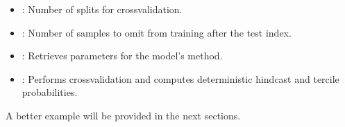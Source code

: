 \documentclass[letterpaper,10pt,english]{sphinxmanual}
\begin{document}
\sphinxAtStartPar
{}
\begin{itemize}
\item {} 
\sphinxAtStartPar
{}: Number of splits for cross\sphinxhyphen{}validation.

\item {} 
\sphinxAtStartPar
{}: Number of samples to omit from training after the test index.

\end{itemize}

\sphinxAtStartPar
{}
\begin{itemize}
\item {} 
\sphinxAtStartPar
{}: Retrieves parameters for the model’s  method.

\item {} 
\sphinxAtStartPar
{}: Performs cross\sphinxhyphen{}validation and computes deterministic hindcast and tercile probabilities.

\end{itemize}

\sphinxAtStartPar
{}

\begin{sphinxVerbatim}[commandchars=\\\{\}]
 

   
\end{sphinxVerbatim}

\sphinxAtStartPar
A better example will be provided in the next sections.
\end{document}

